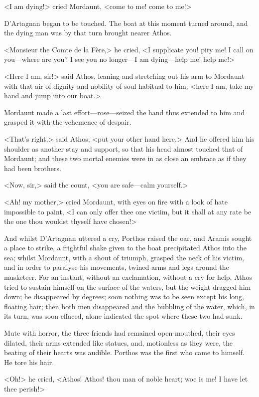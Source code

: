 <I am dying!> cried Mordaunt, <come to me! come to me!>

D'Artagnan began to be touched. The boat at this moment turned around, and the dying man was by that turn brought nearer Athos.

<Monsieur the Comte de la Fère,> he cried, <I supplicate you! pity me! I call on you—where are you? I see you no longer—I am dying—help me! help me!>

<Here I am, sir!> said Athos, leaning and stretching out his arm to Mordaunt with that air of dignity and nobility of soul habitual to him; <here I am, take my hand and jump into our boat.>

Mordaunt made a last effort—rose—seized the hand thus extended to him and grasped it with the vehemence of despair.

<That's right,> said Athos; <put your other hand here.> And he offered him his shoulder as another stay and support, so that his head almost touched that of Mordaunt; and these two mortal enemies were in as close an embrace as if they had been brothers.

<Now, sir,> said the count, <you are safe—calm yourself.>

<Ah! my mother,> cried Mordaunt, with eyes on fire with a look of hate impossible to paint, <I can only offer thee one victim, but it shall at any rate be the one thou wouldst thyself have chosen!>

And whilst D'Artagnan uttered a cry, Porthos raised the oar, and Aramis sought a place to strike, a frightful shake given to the boat precipitated Athos into the sea; whilst Mordaunt, with a shout of triumph, grasped the neck of his victim, and in order to paralyse his movements, twined arms and legs around the musketeer. For an instant, without an exclamation, without a cry for help, Athos tried to sustain himself on the surface of the waters, but the weight dragged him down; he disappeared by degrees; soon nothing was to be seen except his long, floating hair; then both men disappeared and the bubbling of the water, which, in its turn, was soon effaced, alone indicated the spot where these two had sunk.

Mute with horror, the three friends had remained open-mouthed, their eyes dilated, their arms extended like statues, and, motionless as they were, the beating of their hearts was audible. Porthos was the first who came to himself. He tore his hair.

<Oh!> he cried, <Athos! Athos! thou man of noble heart; woe is me! I have let thee perish!>

